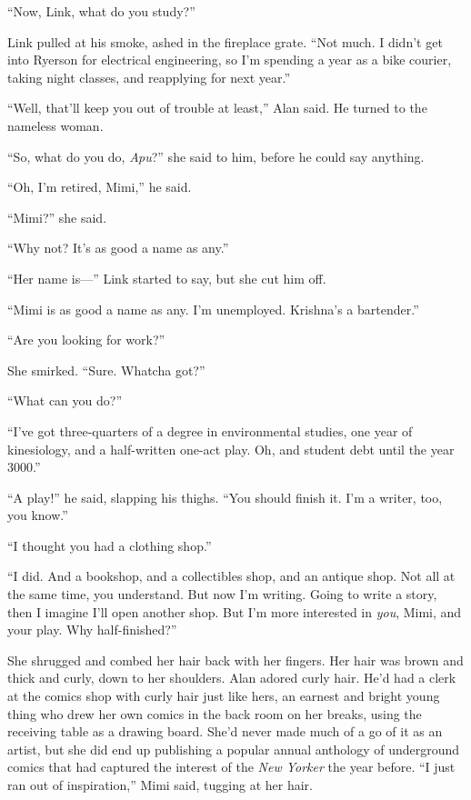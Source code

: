 ``Now, Link, what do you study?''

Link pulled at his smoke, ashed in the fireplace grate.  ``Not much. 
I didn't get into Ryerson for electrical engineering, so I'm spending
a year as a bike courier, taking night classes, and reapplying for
next year.''

``Well, that'll keep you out of trouble at least,'' Alan said.  He
turned to the nameless woman.

``So, what do you do, \textit{Apu}?'' she said to him, before he could
say anything.

``Oh, I'm retired, Mimi,'' he said.

``Mimi?'' she said.

``Why not?  It's as good a name as any.''

``Her name is---'' Link started to say, but she cut him off.

``Mimi is as good a name as any.  I'm unemployed.  Krishna's a
bartender.''

``Are you looking for work?''

She smirked.  ``Sure.  Whatcha got?''

``What can you do?''

``I've got three-quarters of a degree in environmental studies, one
year of kinesiology, and a half-written one-act play.  Oh, and student
debt until the year 3000.''

``A play!'' he said, slapping his thighs.  ``You should finish it. 
I'm a writer, too, you know.''

``I thought you had a clothing shop.''

``I did.  And a bookshop, and a collectibles shop, and an antique
shop.  Not all at the same time, you understand.  But now I'm writing. 
Going to write a story, then I imagine I'll open another shop.  But
I'm more interested in \textit{you}, Mimi, and your play.  Why
half-finished?''

She shrugged and combed her hair back with her fingers.  Her hair was
brown and thick and curly, down to her shoulders.  Alan adored curly
hair.  He'd had a clerk at the comics shop with curly hair just like
hers, an earnest and bright young thing who drew her own comics in the
back room on her breaks, using the receiving table as a drawing board. 
She'd never made much of a go of it as an artist, but she did end up
publishing a popular annual anthology of underground comics that had
captured the interest of the \textit{New Yorker} the year before.  ``I
just ran out of inspiration,'' Mimi said, tugging at her hair.

